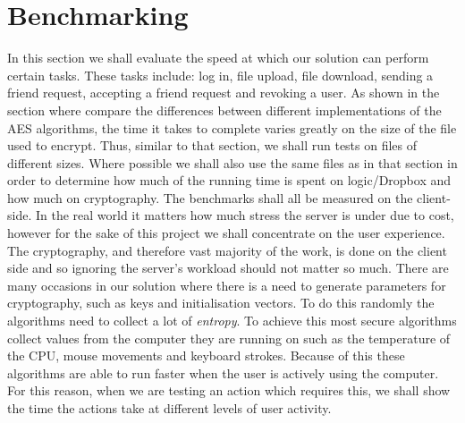 \documentclass[12pt, titlepage]{article}
\begin{document}
\section{Benchmarking}
In this section we shall evaluate the speed at which our solution can perform certain tasks. These tasks include: log in, file upload, file download, sending a friend request, accepting a friend request and revoking a user.
\newline \indent As shown in the section where compare the differences between different implementations of the AES algorithms, the time it takes to complete varies greatly on the size of the file used to encrypt. Thus, similar to that section, we shall run tests on files of different sizes. Where possible we shall also use the same files as in that section in order to determine how much of the running time is spent on logic/Dropbox and how much on cryptography.
\newline \indent The benchmarks shall all be measured on the client-side. In the real world it matters how much stress the server is under due to cost, however for the sake of this project we shall concentrate on the user experience. The cryptography, and therefore vast majority of the work, is done on the client side and so ignoring the server's workload should not matter so much.
\newline \indent There are many occasions in our solution where there is a need to generate parameters for cryptography, such as keys and initialisation vectors. To do this randomly the algorithms need to collect a lot of \textit{entropy}. To achieve this most secure algorithms collect values from the computer they are running on such as the temperature of the CPU, mouse movements and keyboard strokes. Because of this these algorithms are able to run faster when the user is actively using the computer. For this reason, when we are testing an action which requires this, we shall show the time the actions take at different levels of user activity.
\end{document}
